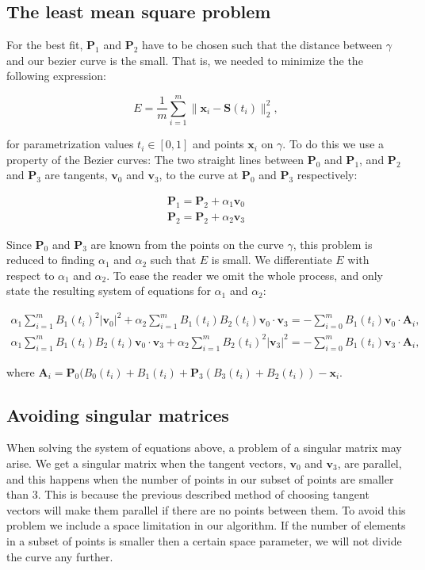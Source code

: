 \documentclass[10pt]{article}
\begin{document}
\subsection*{The least mean square problem}

For the best fit, $\mathbf{P}_1$ and $\mathbf{P}_2$ have to be chosen such that the distance between $\gamma$ and our bezier curve is the small. That is, we needed to minimize the the following expression:

\begin{equation}
E = \frac{1}{m} \sum_{i=1}^{m} \| \mathbf{x}_i - \mathbf{S}(t_i)\|^2_2,
\end{equation}

for parametrization values $t_i \in [ 0,1 ]$ and points $\mathbf{x}_i$ on $\gamma$. To do this we use a property of the Bezier curves: The two straight lines between $\mathbf{P}_0$ and $\mathbf{P}_1$, and $\mathbf{P}_2$ and $\mathbf{P}_3$ are tangents, $\mathbf{v}_0$ and $\mathbf{v}_3$, to the curve at $\mathbf{P}_0$ and $\mathbf{P}_3$ respectively:

\begin{align}
\mathbf{P}_1 = \mathbf{P}_2 + \alpha_1 \mathbf{v}_0 \\
\mathbf{P}_2 = \mathbf{P}_2 + \alpha_2 \mathbf{v}_3
\end{align}

Since $\mathbf{P}_0$ and $\mathbf{P}_3$ are known from the points on the curve $\gamma$, this problem is reduced to finding $\alpha_1$ and $\alpha_2$ such that $E$ is small. We differentiate $E$ with respect to $\alpha_1$ and $\alpha_2$. To ease the reader we omit the whole process, and only state the resulting system of equations for $\alpha_1$ and $\alpha_2$:


\begin{align}
\alpha_1 \sum_{i = 1}^m B_1(t_i)^2 |\mathbf{v}_0|^2 + \alpha_2 \sum_{i = 1}^m B_1(t_i)B_2(t_i)\mathbf{v}_0 \cdot \mathbf{v}_3 
= - \sum_{i = 0}^m B_1(t_i) \mathbf{v}_0 \cdot \mathbf{A}_i, \\
\alpha_1 \sum_{i = 1}^m B_1(t_i)B_2(t_i)\mathbf{v}_0 \cdot \mathbf{v}_3 + \alpha_2 \sum_{i = 1}^m B_2(t_i)^2 |\mathbf{v}_3|^2 
= - \sum_{i = 0}^m B_1(t_i)\mathbf{v}_3 \cdot \mathbf{A}_i,
\end{align}

where $\mathbf{A}_i = \mathbf{P}_0(B_0(t_i) + B_1(t_i) + \mathbf{P}_3(B_3(t_i) + B_2(t_i)) - \mathbf{x}_i$.

\subsection*{Avoiding singular matrices}
When solving the system of equations above, a problem of a singular matrix may arise. We get a singular matrix when the tangent vectors, $\mathbf{v}_0$ and $\mathbf{v}_3$, are parallel, and this happens when the number of points in our subset of points are smaller than 3. This is because the previous described method of choosing tangent vectors will make them parallel if there are no points between them. To avoid this problem we include a space limitation in our algorithm. If the number of elements in a subset of points is smaller then a certain space parameter, we will not divide the curve any further.
\end{document}
